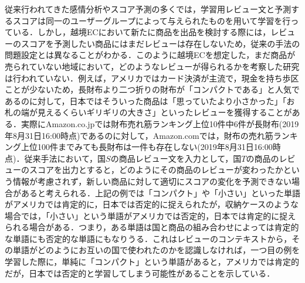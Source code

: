 \documentclass[dvipdfmx,twocolumn,10.5pt]{jsarticle}
\begin{document}
従来行われてきた感情分析やスコア予測の多くでは，学習用レビュー文と予測するスコアは同一のユーザーグループによって与えられたものを用いて学習を行っている．しかし，越境ECにおいて新たに商品を出品を検討する際には，レビューのスコアを予測したい商品にはまだレビューは存在しないため，従来の手法の問題設定とは異なることがわかる．このように越境ECを想定した，まだ商品が売られていない地域において，どのようなレビューが得られるかを考察した研究は行われていない．例えば，アメリカではカード決済が主流で，現金を持ち歩区ことが少ないため，長財布より二つ折りの財布が「コンパクトである」と人気であるのに対して，日本ではそういった商品は「思っていたより小さかった」「お札の端が見えるくらいギリギリの大きさ」といったレビューを獲得することがある．実際にAmazon.co.jpでは財布売れ筋ランキング上位10件中6件が長財布(2019年8月31日16:00時点)であるのに対して，Amazon.comでは，財布の売れ筋ランキング上位100件までみても長財布は一件も存在しない(2019年8月31日16:00時点)．従来手法において，国$S$の商品レビュー文を入力として，国$T$の商品のレビューのスコアを出力とすると，どのようにその商品のレビューが変わったかという情報が考慮されず，新しい商品に対して適切にスコアの変化を予測できない場合があると考えられる．上記の例では「コンパクト」や「小さい」といった単語がアメリカでは肯定的に，日本では否定的に捉えられたが，収納ケースのような場合では，「小さい」という単語がアメリカでは否定的，日本では肯定的に捉えられる場合がある．つまり，ある単語は国と商品の組み合わせによっては肯定的な単語にも否定的な単語にもなりうる．これはレビューのコンテキストから，その単語がどのようにお互いの国で使われたのかを認識しなければ，一つ目の例を学習した際に，単純に「コンパクト」という単語があると，アメリカでは肯定的だが，日本では否定的と学習してしまう可能性があることを示している．
\end{document}
